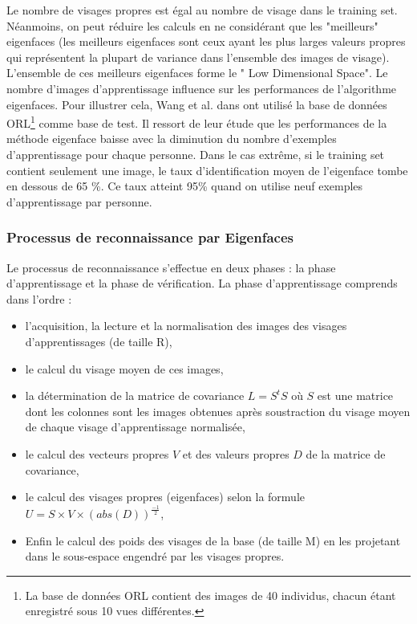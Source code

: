 Le nombre de visages propres est égal au nombre de visage dans le training set. Néanmoins, on peut réduire les calculs en ne considérant que les "meilleurs" eigenfaces (les meilleurs eigenfaces sont ceux ayant les plus larges valeurs propres qui représentent la plupart de variance dans l'ensemble des images de visage). L'ensemble  
de ces meilleurs eigenfaces forme le " Low Dimensional Space".
Le nombre d'images d'apprentissage influence sur les performances de l'algorithme eigenfaces. Pour illustrer cela, Wang et al. dans \citep{WAN} ont utilisé la base de données ORL\footnote{La base de données ORL 
contient des images de 40 individus, chacun étant enregistré sous 10 vues différentes.} comme base de test. Il ressort de leur étude que les performances de la méthode eigenface baisse avec la diminution du nombre d’exemples d'apprentissage pour chaque personne.  Dans le cas extrême, si le training set contient seulement une image, le taux d'identification moyen de l'eigenface tombe en dessous de 65 \%. Ce taux atteint 95\% quand on utilise neuf exemples d'apprentissage par personne. 


\subsubsection{Processus de reconnaissance par Eigenfaces}
Le processus de reconnaissance s'effectue en deux phases : la phase d'apprentissage et la phase de vérification.
La phase d'apprentissage  comprends dans l'ordre : 

\begin{itemize}
	\item [\textbullet]l'acquisition, la lecture et la normalisation des images des visages d'apprentissages (de taille R),
	\item [\textbullet]le calcul du visage moyen de ces images,
	\item [\textbullet]la détermination de la matrice de covariance $L=S^tS$ où $S$ est une matrice dont les colonnes sont les images obtenues après soustraction du visage moyen de chaque visage d'apprentissage normalisée,
	\item [\textbullet]le calcul des vecteurs propres $V$ et des valeurs propres $D$ de la matrice de covariance,
	\item [\textbullet]le calcul des visages propres (eigenfaces) selon la formule $U=S\times V\times (abs(D))^\frac{-1}{2}$,
	\item [\textbullet]Enfin le calcul des poids des visages de la base (de taille M) en les projetant dans le sous-espace engendré par les visages propres.
\end{itemize} 
   
